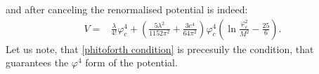 and after canceling the renormalised potential is indeed:
\begin{align}
V = &\frac{\lambda}{4!}\varphi_c^4
+\left(\frac{5\lambda^2}{1152\pi^2}+\frac{3e^4}{64\pi^2}\right)\varphi_c^4
\left(\ln\frac{\varphi_c^2}{M^2}-\frac{25}{6}\right).
\end{align}
Let us note, that 
\ref{phitoforth condition}
is precesuily the condition, that guarantees the $\varphi^4$ form of the potential.
\label{CWe4potential}
